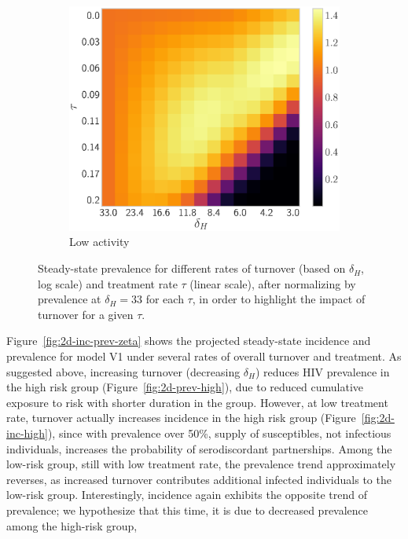 \documentclass[10pt]{article}
\newlength{\figi}  \setlength{\figi}  {0.800\textwidth}
\newlength{\figii} \setlength{\figii} {0.490\textwidth}
\newlength{\figiii}\setlength{\figiii}{0.325\textwidth}
\numberwithin{equation}{section}
\newcommand{\fig}[1]{Figure~\ref{#1}}
\begin{document}
\begin{figure}
  \begin{subfigure}{\figiii}
    \includegraphics[width=\textwidth]{2d-prevalence-norm-low.eps}
    \caption{Low activity}
    \label{fig:2d-prev-norm-low}
  \end{subfigure}
  \caption{Steady-state prevalence
    for different rates of turnover (based on $\delta_H$, log scale)
    and treatment rate $\tau$ (linear scale),
    after normalizing by prevalence at $\delta_H = 33$ for each $\tau$,
    in order to highlight the impact of turnover for a given $\tau$.}
  \label{fig:2d-prev-norm-zeta}
\end{figure}
\fig{fig:2d-inc-prev-zeta} shows the projected steady-state incidence and prevalence
for model V1 under several rates of overall turnover and treatment.
As suggested above, increasing turnover (decreasing $\delta_H$)
reduces HIV prevalence in the high risk group (\fig{fig:2d-prev-high}),
due to reduced cumulative exposure to risk with shorter duration in the group.
However, at low treatment rate,
turnover actually increases incidence in the high risk group (\fig{fig:2d-inc-high}),
since with prevalence over 50\%, supply of susceptibles, not infectious individuals,
increases the probability of serodiscordant partnerships.
Among the low-risk group, still with low treatment rate,
the prevalence trend approximately reverses,
as increased turnover contributes additional infected individuals to the low-risk group.
Interestingly, incidence again exhibits the opposite trend of prevalence;
we hypothesize that this time, it is due to
decreased prevalence among the high-risk group,
\end{document}
